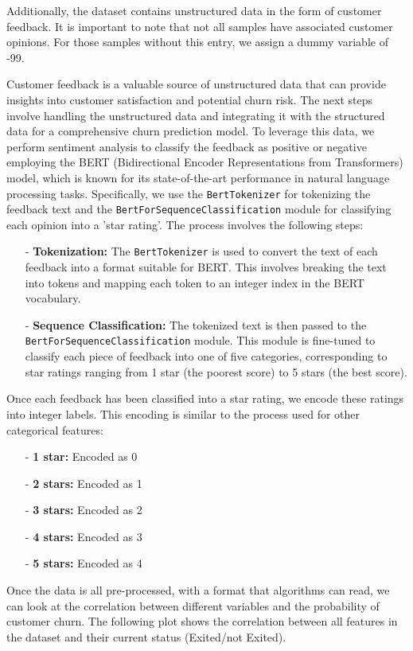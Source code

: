 \documentclass[12pt,titlepage]{article}
\begin{document}
Additionally, the dataset contains unstructured data in the form of customer feedback. It is important to note that not all samples have associated customer opinions. For those samples without this entry, we assign a dummy variable of -99.


Customer feedback is a valuable source of unstructured data that can provide insights into customer satisfaction and potential churn risk.
The next steps involve handling the unstructured data and integrating it with the structured data for a comprehensive churn prediction model.
To leverage this data, we perform sentiment analysis to classify the feedback as positive or negative employing the BERT (Bidirectional Encoder Representations from Transformers) model, which is known for its state-of-the-art performance in natural language processing tasks. Specifically, we use the \texttt{BertTokenizer} for tokenizing the feedback text and the \texttt{BertForSequenceClassification} module for classifying each opinion into a 'star rating'. The process involves the following steps:
\begin{itemize}
    \item[-] \textbf{Tokenization:} The \texttt{BertTokenizer} is used to convert the text of each feedback into a format suitable for BERT. This involves breaking the text into tokens and mapping each token to an integer index in the BERT vocabulary.
    \item[-] \textbf{Sequence Classification:} The tokenized text is then passed to the \texttt{BertForSequenceClassification} module. This module is fine-tuned to classify each piece of feedback into one of five categories, corresponding to star ratings ranging from 1 star (the poorest score) to 5 stars (the best score).
\end{itemize}  Once each feedback has been classified into a star rating, we encode these ratings into integer labels. This encoding is similar to the process used for other categorical features:
\begin{itemize}
    \item[-] \textbf{1 star:} Encoded as 0
    \item[-] \textbf{2 stars:} Encoded as 1
    \item[-] \textbf{3 stars:} Encoded as 2
    \item[-] \textbf{4 stars:} Encoded as 3
    \item[-] \textbf{5 stars:} Encoded as 4
\end{itemize}


Once the data is all pre-processed, with a format that algorithms can read, we can look at the correlation between different variables and the probability of customer churn. The following plot shows the correlation between all features in the dataset and their current status (Exited/not Exited). 
\end{document}
